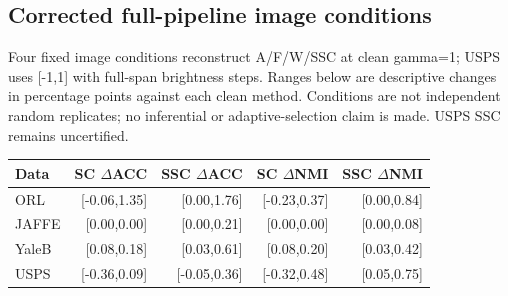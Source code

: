 \subsection{Corrected full-pipeline image conditions}
Four fixed image conditions reconstruct A/F/W/SSC at clean gamma=1; USPS uses [-1,1] with full-span brightness steps. Ranges below are descriptive changes in percentage points against each clean method. Conditions are not independent random replicates; no inferential or adaptive-selection claim is made. USPS SSC remains uncertified.
\begin{center}\small\begin{tabular}{lrrrr}\toprule Data & SC $\Delta$ACC & SSC $\Delta$ACC & SC $\Delta$NMI & SSC $\Delta$NMI \\\midrule
ORL & [-0.06,1.35] & [0.00,1.76] & [-0.23,0.37] & [0.00,0.84] \\
JAFFE & [0.00,0.00] & [0.00,0.21] & [0.00,0.00] & [0.00,0.08] \\
YaleB & [0.08,0.18] & [0.03,0.61] & [0.08,0.20] & [0.03,0.42] \\
USPS & [-0.36,0.09] & [-0.05,0.36] & [-0.32,0.48] & [0.05,0.75] \\
\bottomrule\end{tabular}\end{center}
